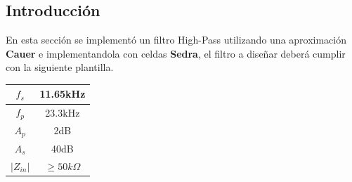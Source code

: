 


\subsection{Introducción}

En esta sección se implementó un filtro High-Pass utilizando una aproximación \textbf{Cauer} e implementandola con celdas \textbf{Sedra}, el filtro a diseñar deberá cumplir con la siguiente plantilla.
\begin{table}[H]
\centering
\begin{tabular}{|c|c|}
\hline
$f_s$      & 11.65kHz          \\ \hline
$f_p$      & 23.3kHz           \\ \hline
$A_p$      & 2dB               \\ \hline
$A_s$      & 40dB              \\ \hline
$|Z_{in}|$ & $\geq 50k \Omega$ \\ \hline
\end{tabular}
\end{table}
